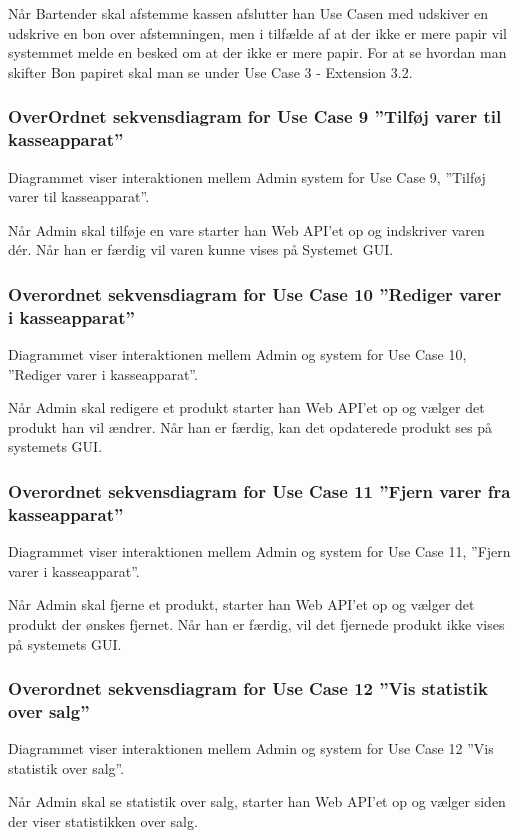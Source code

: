 
Når Bartender skal afstemme kassen afslutter han Use Casen med udskiver en udskrive en bon over afstemningen, men i tilfælde af at der ikke er mere papir vil systemmet melde en besked om at der ikke er mere papir.
\newline\newline
For at se hvordan man skifter Bon papiret skal man se under Use Case 3 - Extension 3.2.


\subsubsection{OverOrdnet sekvensdiagram for Use Case 9 ''Tilføj varer til kasseapparat''}
Diagrammet viser interaktionen mellem Admin system for Use Case 9, ''Tilføj varer til kasseapparat''.


Når Admin skal tilføje en vare starter han Web API'et op og indskriver varen dér. Når han er færdig vil varen kunne vises på Systemet GUI. 

\subsubsection{Overordnet sekvensdiagram for Use Case 10 ''Rediger varer i kasseapparat''}
Diagrammet viser interaktionen mellem Admin og system for Use Case 10, ''Rediger varer i kasseapparat''.


Når Admin skal redigere et produkt starter han Web API'et op og vælger det produkt han vil ændrer. Når han er færdig, kan det opdaterede produkt ses på systemets GUI.

\subsubsection{Overordnet sekvensdiagram for Use Case 11 ''Fjern varer fra kasseapparat''}
Diagrammet viser interaktionen mellem Admin og system for Use Case 11, ''Fjern varer i kasseapparat''.


Når Admin skal fjerne et produkt, starter han Web API'et op og vælger det produkt der ønskes fjernet. Når han er færdig, vil det fjernede produkt ikke vises på systemets GUI.

\subsubsection{Overordnet sekvensdiagram for Use Case 12 ''Vis statistik over salg''}
Diagrammet viser interaktionen mellem Admin og system for Use Case 12 ''Vis statistik over salg''.


Når Admin skal se statistik over salg, starter han Web API'et op og vælger siden der viser statistikken over salg.  